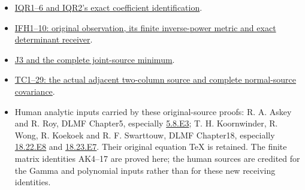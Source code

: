 \begin{itemize}
\tightlist
\item
  \href{https://github.com/KokunoYumeto/zeta-function-research-reader/blob/ab120cf974feb26a31d77b07458b6da52f912ea4/workbenches/splitzero-tandem/continuations/20260921-inverse-quotient/INVERSE_QUOTIENT_RECEIVERS.tex}{IQR1--6 and IQR2's exact coefficient identification}.
\item
  \href{https://github.com/KokunoYumeto/zeta-function-research-reader/blob/edd4008690952fb8568a01744e49ad7e180401e9/workbenches/splitzero-tandem/continuations/20260921-original-observation/INVERSE_FLAG_AND_RELATIVE_HEAT.tex}{IFH1--10: original observation, its finite inverse-power metric and exact determinant receiver}.
\item
  \href{https://github.com/KokunoYumeto/zeta-function-research-reader/blob/f1ad8be11f329a12d562420edfa58fa464948ee2/workbenches/splitzero-tandem/continuations/20260921-uniform-source-family/JOINT_MINIMUM_COMPLETE.tex\#L634}{J3 and the complete joint-source minimum}.
\item
  \href{https://github.com/KokunoYumeto/zeta-function-research-reader/blob/f1ad8be11f329a12d562420edfa58fa464948ee2/workbenches/splitzero-tandem/continuations/20260921-uniform-source-family/TWO_COLUMN_ACTUAL_UPDATE.md}{TC1--29: the actual adjacent two-column source and complete normal-source covariance}.
\item
  Human analytic inputs carried by these original-source proofs: R. A. Askey and R. Roy, DLMF Chapter5, especially \href{https://dlmf.nist.gov/5.8.E3}{5.8.E3}; T. H. Koornwinder, R. Wong, R. Koekoek and R. F. Swarttouw, DLMF Chapter18, especially \href{https://dlmf.nist.gov/18.22.E8}{18.22.E8} and \href{https://dlmf.nist.gov/18.23.E7}{18.23.E7}. Their original equation TeX is retained. The finite matrix identities AK4--17 are proved here; the human sources are credited for the Gamma and polynomial inputs rather than for these new receiving identities.
\end{itemize}
